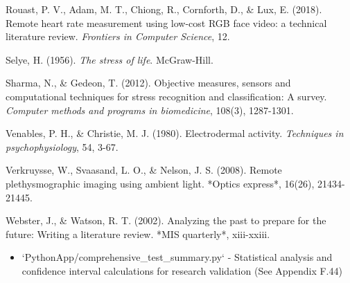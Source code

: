 \documentclass[12pt,a4paper]{article}
\begin{document}
Rouast, P. V., Adam, M. T., Chiong, R., Cornforth, D., \& Lux, E. (2018). Remote heart rate measurement using low-cost
RGB face video: a technical literature review. \textit{Frontiers in Computer Science}, 12.

Selye, H. (1956). \textit{The stress of life}. McGraw-Hill.

Sharma, N., \& Gedeon, T. (2012). Objective measures, sensors and computational techniques for stress recognition and
classification: A survey. \textit{Computer methods and programs in biomedicine}, 108(3), 1287-1301.

Venables, P. H., \& Christie, M. J. (1980). Electrodermal activity. \textit{Techniques in psychophysiology}, 54, 3-67.

Verkruysse, W., Svaasand, L. O., \& Nelson, J. S. (2008). Remote plethysmographic imaging using ambient light. *Optics
express*, 16(26), 21434-21445.

Webster, J., \& Watson, R. T. (2002). Analyzing the past to prepare for the future: Writing a literature review. *MIS
quarterly*, xiii-xxiii.

\begin{itemize}
\item `PythonApp/comprehensive_test_summary.py` - Statistical analysis and confidence interval calculations for research
  validation (See Appendix F.44)
\end{itemize}
\end{document}
